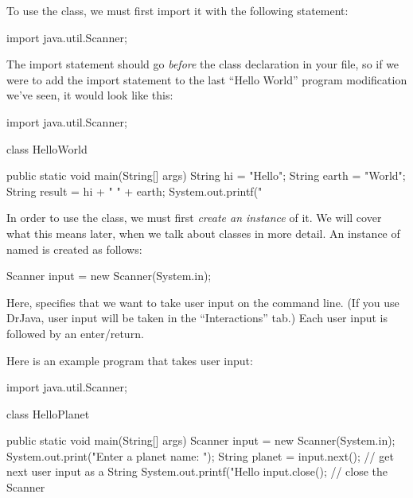 To use the  class, we must first import it
with the following statement:
\begin{code}
import java.util.Scanner;
\end{code}
The import statement should go \emph{before} the class declaration in your file, so
if we were to add the import statement to the last ``Hello World'' program modification
we've seen, it would look like this:

\begin{code}
import java.util.Scanner;

class HelloWorld {

    public static void main(String[] args) {
        String hi = "Hello";
        String earth = "World";
        String result = hi + " " + earth;
        System.out.printf("%
    }

}
\end{code}

In order to use the  class, we must first \emph{create an instance} of it.
We will cover what this means later, when we talk about classes in more detail.
An instance of  named  is created as follows:
\begin{code}
Scanner input = new Scanner(System.in);
\end{code}
Here,  specifies that we want to take user input
on the command line. (If you use DrJava, user input will be taken
in the ``Interactions'' tab.) Each user input is followed by an enter/return.

Here is an example program that takes user input:
\begin{code}
import java.util.Scanner;

class HelloPlanet {

  public static void main(String[] args) {
    Scanner input = new Scanner(System.in);
    System.out.print("Enter a planet name: ");
    String planet = input.next(); // get next user input as a String
    System.out.printf("Hello %
    input.close(); // close the Scanner
  }

}
\end{code}

